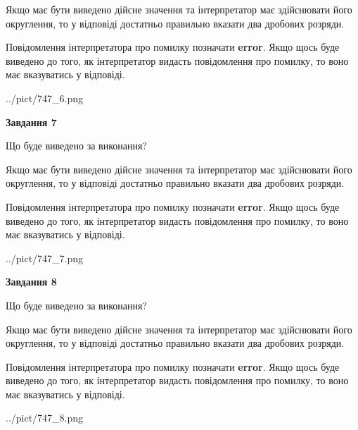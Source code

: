 \documentclass[12pt, ukrainian]{article}
\begin{document}
{\begin {Large}
Якщо має бути виведено дійсне значення та інтерпретатор має здійснювати його округлення, 
то у відповіді достатньо правильно вказати два дробових розряди.

Повідомлення інтерпретатора про помилку позначати \textbf{error}.
Якщо щось буде виведено до того, як інтерпретатор видасть повідомлення про помилку, 
то воно має вказуватись у відповіді. \par

\begin{center}
	{../pict/747_6.png}
\end{center}
\newpage

{\begin {center}\textbf{Завдання 7}\end {center}}\par
Що буде виведено за виконання? \par

Якщо має бути виведено дійсне значення та інтерпретатор має здійснювати його округлення, 
то у відповіді достатньо правильно вказати два дробових розряди.

Повідомлення інтерпретатора про помилку позначати \textbf{error}.
Якщо щось буде виведено до того, як інтерпретатор видасть повідомлення про помилку, 
то воно має вказуватись у відповіді. \par

\begin{center}
	{../pict/747_7.png}
\end{center}
\newpage

{\begin {center}\textbf{Завдання 8}\end {center}}\par
Що буде виведено за виконання? \par

Якщо має бути виведено дійсне значення та інтерпретатор має здійснювати його округлення, 
то у відповіді достатньо правильно вказати два дробових розряди.

Повідомлення інтерпретатора про помилку позначати \textbf{error}.
Якщо щось буде виведено до того, як інтерпретатор видасть повідомлення про помилку, 
то воно має вказуватись у відповіді. \par

\begin{center}
	{../pict/747_8.png}
\end{center}
\newpage


\end{Large}}
\end{document}
